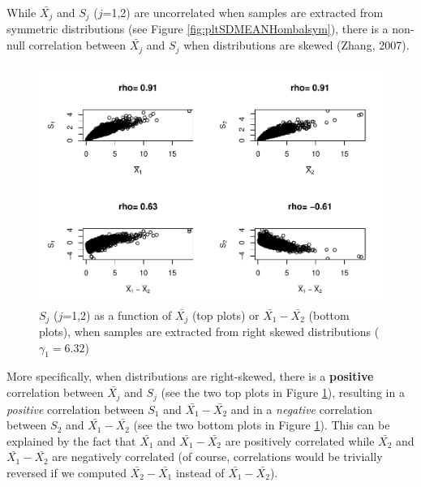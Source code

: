 \documentclass[
  english,
  man,mask]{apa6}
\begin{document}
While \(\bar{X_j}\) and \(S_j\) (\(j\)=1,2) are uncorrelated when samples are extracted from symmetric distributions (see Figure \ref{fig:pltSDMEANHombalsym}), there is a non-null correlation between \(\bar{X_j}\) and \(S_j\) when distributions are skewed (Zhang, 2007).

\begin{figure}
\centering
\includegraphics{Correlation_files/figure-latex/pltSDHombalRskew-1.pdf}
\caption{\label{fig:pltSDHombalRskew}\(S_j\) (\(j\)=1,2) as a function of \(\bar{X_j}\) (top plots) or \(\bar{X_1}-\bar{X_2}\) (bottom plots), when samples are extracted from right skewed distributions (\(\gamma_1 = 6.32\))}
\end{figure}

More specifically, when distributions are right-skewed, there is a \textbf{positive} correlation between \(\bar{X_j}\) and \(S_j\) (see the two top plots in Figure \ref{fig:pltSDHombalRskew}), resulting in a \emph{positive} correlation between \(S_1\) and \(\bar{X_1}-\bar{X_2}\) and in a \emph{negative} correlation between \(S_2\) and \(\bar{X_1}-\bar{X_2}\) (see the two bottom plots in Figure \ref{fig:pltSDHombalRskew}). This can be explained by the fact that \(\bar{X_1}\) and \(\bar{X_1}-\bar{X_2}\) are positively correlated while \(\bar{X_2}\) and \(\bar{X_1}-\bar{X_2}\) are negatively correlated (of course, correlations would be trivially reversed if we computed \(\bar{X_2}-\bar{X_1}\) instead of \(\bar{X_1}-\bar{X_2}\)).
\end{document}
